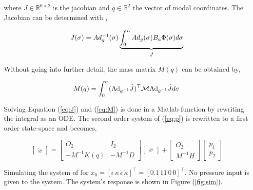 where $J \in \mathbb{R}^{6\times 2}$ is the jacobian and $q \in \mathbb{R}^2$ the vector of modal coordinates. The Jacobian can be determined with \cite{Caasenbrood2020},


\begin{equation}
    J(\sigma) = Ad_g^{-1}(\sigma) \underbrace{\int_0^L Ad_g(\sigma) B_a\Phi(\sigma)d\sigma}_{\Tilde{J}}
    \label{eq:J}
\end{equation}

Without going into further detail, the mass matrix $M(q)$ can be obtained by,

\begin{equation}
    M(q) = \int_0^{\sigma} (\text{Ad}_{g^{-1}}\Tilde{J})^\top \mathcal{M}  \text{Ad}_{g^{-1}}\Tilde{J} d \sigma 
    \label{eq:M}
\end{equation}

Solving Equation (\ref{eq:J}) and (\ref{eq:M}) is done in a Matlab function by rewriting the integral as an ODE. The second order system of (\ref{eq:p}) is rewritten to a first order state-space and becomes,

\begin{equation}
     \begin{bmatrix} \dot{x} \end{bmatrix}   =      \begin{bmatrix} O_2 & I_2 \\ -M^{-1}K(q)  & -M^{-1}D \end{bmatrix}      \begin{bmatrix} x \end{bmatrix}  +      \begin{bmatrix} O_2 \\ M^{-1}H   \end{bmatrix}       \begin{bmatrix} p_1\\ p_2   \end{bmatrix} 
\end{equation}

Simulating the system of for $x_0 = [\epsilon \hspace{2pt} \kappa \hspace{2pt} \dot{\epsilon} \hspace{2pt} \dot{\kappa}]^\top = [0.1 \hspace{2pt} 11 \hspace{2pt} 0 \hspace{2pt} 0]^\top $. No pressure input is given to the system. The system's response is shown in Figure (\ref{fig:sim}).


